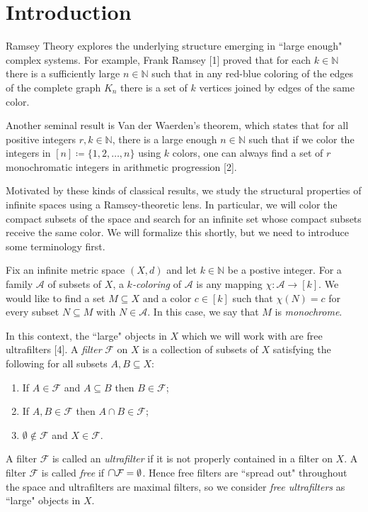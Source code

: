 \section{Introduction}
Ramsey Theory explores the underlying structure emerging in ``large enough" complex systems. For example, Frank Ramsey [1] proved that for each \( k \in \mathbb{N}  \) there is a sufficiently large \( n \in \mathbb{N}  \) such that in any red-blue coloring of the edges of the complete graph \( K_{n} \) there is a set of \( k \) vertices joined by edges of the same color.

Another seminal result is Van der Waerden's theorem, which states that for all positive integers \( r, k \in \mathbb{N}  \), there is a large enough \( n \in \mathbb{N}  \) such that if we color the integers in \( [n] \coloneqq \{ 1,2,\hdots ,n \}  \) using \( k \) colors, one can always find a set of \( r \) monochromatic integers in arithmetic progression [2].

Motivated by these kinds of classical results, we study the structural properties of infinite spaces using a Ramsey-theoretic lens. In particular, we will color the compact subsets of the space and search for an infinite set whose compact subsets receive the same color. We will formalize this shortly, but we need to introduce some terminology first.

Fix an infinite metric space \( (X,d) \) and let \( k \in \mathbb{N}  \) be a postive integer. For a family \( \mathcal{A} \) of subsets of \( X \), a \emph{\( k \)-coloring} of \( \mathcal{A}  \) is any mapping \( \chi : \mathcal{A} \to [k] \). We would like to find a set \( M \subseteq X \) and a color \( c \in [k] \) such that \( \chi(N) = c \) for every subset \( N \subseteq M \) with \(N \in \mathcal{A}  \). In this case, we say that \( M \) is \emph{monochrome}.

In this context, the ``large" objects in \( X \) which we will work with are free ultrafilters [4]. A \emph{filter} \( \mathcal{F}  \) on \( X \) is a collection of subsets of \( X \) satisfying the following for all subsets \( A, B \subseteq X \):
\begin{enumerate}[leftmargin=1.2cm]
	
	\item If \( A \in \mathcal{F} \) and \( A \subseteq B \) then \( B \in \mathcal{F}  \);
	\item If \( A, B \in \mathcal{F}  \) then \( A \cap B \in \mathcal{F}  \);
	\item \( \emptyset  \notin \mathcal{F}  \) and \( X \in \mathcal{F}  \).
\end{enumerate}
A filter \( \mathcal{F}  \) is called an \emph{ultrafilter} if it is not properly contained in a filter on \( X \). A filter \( \mathcal{F}  \) is called \emph{free} if \( \medcap \mathcal{F} = \emptyset  \). Hence free filters are ``spread out" throughout the space and ultrafilters are maximal filters, so we consider \emph{free ultrafilters} as ``large" objects in \( X \).

